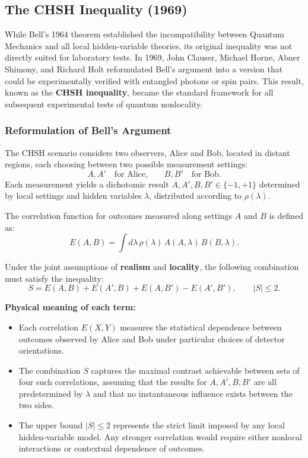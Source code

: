 \subsection{The CHSH Inequality (1969)}

While Bell’s 1964 theorem established the incompatibility between Quantum Mechanics and all local hidden-variable theories, its original inequality was not directly suited for laboratory tests.  
In 1969, John Clauser, Michael Horne, Abner Shimony, and Richard Holt reformulated Bell’s argument into a version that could be experimentally verified with entangled photons or spin pairs.  
This result, known as the \textbf{CHSH inequality}, became the standard framework for all subsequent experimental tests of quantum nonlocality.

\subsubsection{Reformulation of Bell’s Argument}

The CHSH scenario considers two observers, Alice and Bob, located in distant regions, each choosing between two possible measurement settings:
\[
A, A' \quad \text{for Alice,} \qquad B, B' \quad \text{for Bob.}
\]
Each measurement yields a dichotomic result $A, A', B, B' \in \{-1, +1\}$ determined by local settings and hidden variables $\lambda$, distributed according to $\rho(\lambda)$.

The correlation function for outcomes measured along settings $A$ and $B$ is defined as:
\begin{equation}
E(A,B) = \int d\lambda\, \rho(\lambda)\, A(A,\lambda)\, B(B,\lambda).
\end{equation}

Under the joint assumptions of \textbf{realism} and \textbf{locality}, the following combination must satisfy the inequality:
\begin{equation}
S = E(A,B) + E(A',B) + E(A,B') - E(A',B'),
\qquad
|S| \le 2.
\label{eq:CHSH}
\end{equation}

\noindent
\textbf{Physical meaning of each term:}
\begin{itemize}
    \item Each correlation $E(X,Y)$ measures the statistical dependence between outcomes observed by Alice and Bob under particular choices of detector orientations.  
    \item The combination $S$ captures the maximal contrast achievable between sets of four such correlations, assuming that the results for $A, A', B, B'$ are all predetermined by $\lambda$ and that no instantaneous influence exists between the two sides.
    \item The upper bound $|S|\le 2$ represents the strict limit imposed by any local hidden-variable model.  
    Any stronger correlation would require either nonlocal interactions or contextual dependence of outcomes.
\end{itemize}

